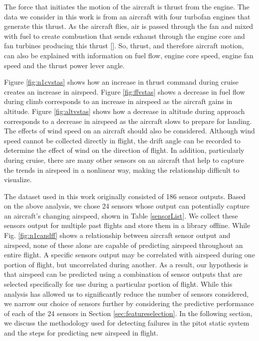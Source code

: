 \documentclass[]{aiaa-tc}
\begin{document}
The force that initiates the motion of the aircraft is thrust from the engine. The data we consider in this work is from an aircraft with four turbofan engines that generate this thrust. As the aircraft flies, air is passed through the fan and mixed with fuel to create combustion that sends exhaust through the engine core and fan turbines producing this thrust []. So, thrust, and therefore aircraft motion, can also be explained with information on fuel flow, engine core speed, engine fan speed and the thrust power lever angle. 

Figure \ref{fig:n1cvstas} shows how an increase in thrust command during cruise creates an increase in airspeed. Figure \ref{fig:ffvstas} shows a decrease in fuel flow during climb corresponds to an increase in airspeed as the aircraft gains in altitude. Figure \ref{fig:altvstas} shows how a decrease in altitude during approach corresponds to a decrease in airspeed as the aircraft slows to prepare for landing. The effects of wind speed on an aircraft should also be considered. Although wind speed cannot be collected directly in flight, the drift angle can be recorded to determine the effect of wind on the direction of flight.  In addition, particularly during cruise, there are many other sensors on an aircraft that help to capture the trends in airspeed in a nonlinear way, making the relationship difficult to visualize. 

The dataset used in this work originally consisted of 186 sensor outputs. Based on the above analysis, we chose 24 sensors whose output can potentially capture an aircraft's changing airspeed, shown in Table \ref{sensorList}. We collect these sensors output for multiple past flights and store them in a library offline. While Fig. \ref{fig:n1candff} shows a relationship between aircraft sensor output and airspeed, none of these alone are capable of predicting airspeed throughout an entire flight. A specific sensors output may be correlated with airspeed during one portion of flight, but uncorrelated during another. As a result, our hypothesis is that airspeed can be predicted using a combination of sensor outputs that are selected specifically for use during a particular portion of flight. While this analysis has allowed us to significantly reduce the number of sensors considered, we narrow our choice of sensors further by considering the predictive performance of each of the 24 sensors in Section \ref{sec:featureselection}. In the following section, we discuss the methodology used for detecting failures in the pitot static system and the steps for predicting new airspeed in flight. 
\end{document}
